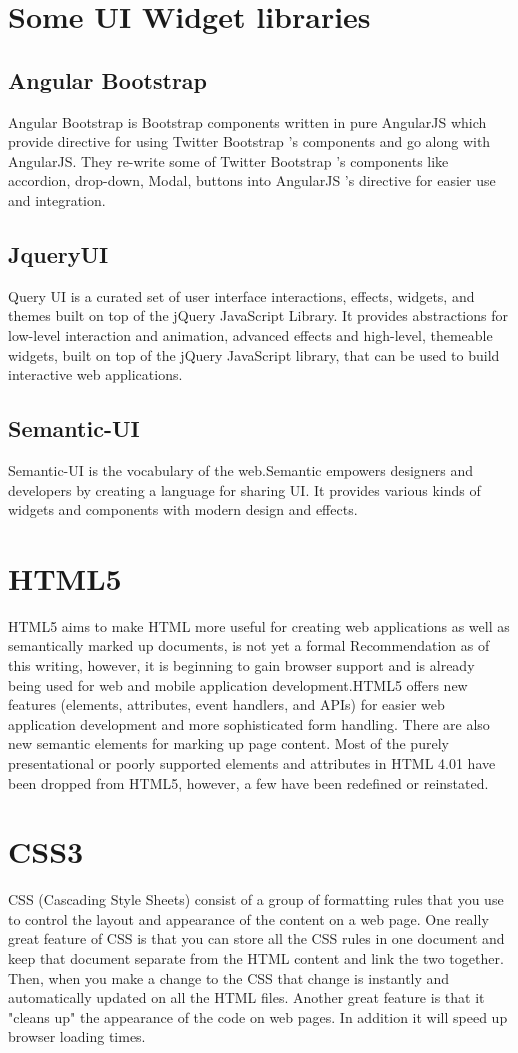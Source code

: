 \documentclass[14pt,a4paper]{extreport}
\begin{document}
	\section{Some UI Widget libraries}
		\subsection{Angular Bootstrap}
		Angular Bootstrap is Bootstrap components written in pure AngularJS which provide directive for using Twitter Bootstrap 's components and go along with AngularJS. They re-write some of Twitter Bootstrap 's components like accordion, drop-down, Modal, buttons into AngularJS 's directive for easier use and integration.
		\subsection{JqueryUI}
		Query UI is a curated set of user interface interactions, effects, widgets, and themes built on top of the jQuery JavaScript Library. It provides abstractions for low-level interaction and animation, advanced effects and high-level, themeable widgets, built on top of the jQuery JavaScript library, that can be used to build interactive web applications. 
		\subsection{Semantic-UI}
		Semantic-UI is the vocabulary of the web.Semantic empowers designers and developers by creating a language for sharing UI. It provides various kinds of widgets and components with modern design and effects.
	\section{HTML5}
	HTML5 aims to make HTML more useful for creating web applications as well as semantically marked up documents, is not yet a formal Recommendation as of this writing, however, it is beginning to gain browser support and is already being used for web and mobile application development.HTML5 offers new features (elements, attributes, event handlers, and APIs) for easier web application development and more sophisticated form handling. There are also new semantic elements for marking up page content. Most of the purely presentational or poorly supported elements and attributes in HTML 4.01 have been dropped from HTML5, however, a few have been redefined or reinstated.
	
	\section{CSS3}
	CSS (Cascading Style Sheets) consist of a group of formatting rules that you use to control the layout and appearance of the content on a web page. One really great feature of CSS is that you can store all the CSS rules in one document and keep that document separate from the HTML content and link the two together. Then, when you make a change to the CSS that change is instantly and automatically updated on all the HTML files. Another great feature is that it "cleans up" the appearance of the code on web pages. In addition it will speed up browser loading times.
\end{document}
